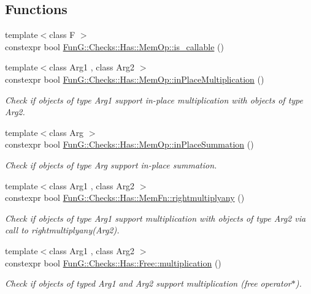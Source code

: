 \subsection*{Functions}
\begin{DoxyCompactItemize}
\item 
{\footnotesize template$<$class F $>$ }\\constexpr bool \hyperlink{namespaceFunG_1_1Checks_1_1Has_1_1MemOp_a5810c07eff37faaf76b881548a6722bd}{Fun\-G\-::\-Checks\-::\-Has\-::\-Mem\-Op\-::is\-\_\-callable} ()
\item 
{\footnotesize template$<$class Arg1 , class Arg2 $>$ }\\constexpr bool \hyperlink{namespaceFunG_1_1Checks_1_1Has_1_1MemOp_ae8e502928ebc6342cab98ebbb62b8802}{Fun\-G\-::\-Checks\-::\-Has\-::\-Mem\-Op\-::in\-Place\-Multiplication} ()
\begin{DoxyCompactList}\small\item\em Check if objects of type Arg1 support in-\/place multiplication with objects of type Arg2. \end{DoxyCompactList}\item 
{\footnotesize template$<$class Arg $>$ }\\constexpr bool \hyperlink{namespaceFunG_1_1Checks_1_1Has_1_1MemOp_a23052f7d8da399943f6354a7d477c825}{Fun\-G\-::\-Checks\-::\-Has\-::\-Mem\-Op\-::in\-Place\-Summation} ()
\begin{DoxyCompactList}\small\item\em Check if objects of type Arg support in-\/place summation. \end{DoxyCompactList}\item 
{\footnotesize template$<$class Arg1 , class Arg2 $>$ }\\constexpr bool \hyperlink{namespaceFunG_1_1Checks_1_1Has_1_1MemFn_adeb3d401c6464514644930596c3a4ccc}{Fun\-G\-::\-Checks\-::\-Has\-::\-Mem\-Fn\-::rightmultiplyany} ()
\begin{DoxyCompactList}\small\item\em Check if objects of type Arg1 support multiplication with objects of type Arg2 via call to rightmultiplyany(\-Arg2). \end{DoxyCompactList}\item 
{\footnotesize template$<$class Arg1 , class Arg2 $>$ }\\constexpr bool \hyperlink{namespaceFunG_1_1Checks_1_1Has_1_1Free_a2454bd1f5873cc86ec31d09d822a67b1}{Fun\-G\-::\-Checks\-::\-Has\-::\-Free\-::multiplication} ()
\begin{DoxyCompactList}\small\item\em Check if objects of typed Arg1 and Arg2 support multiplication (free operator$\ast$). \end{DoxyCompactList}\item 

\end{DoxyCompactItemize}
